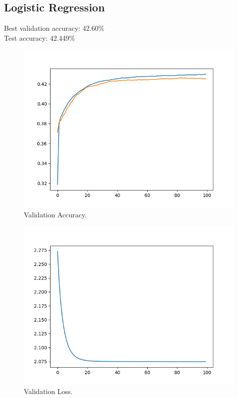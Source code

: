 \documentclass[12pt, letter]{article}
\begin{document}
{\pagebreak

\subsection{Logistic Regression}
Best validation accuracy: 42.60\% \\
Test accuracy: 42.449\% \\
\begin{figure}[h]
  \centering
  \includegraphics[scale=0.60]{hog_logreg_accuracy}
  \caption{Validation Accuracy.}
  \label{fig:eg}
\end{figure}
\begin{figure}[h]
  \centering
  \includegraphics[scale=0.60]{hog_logreg_loss}
  \caption{Validation Loss.}
  \label{fig:eg}
\end{figure}

}
\end{document}

